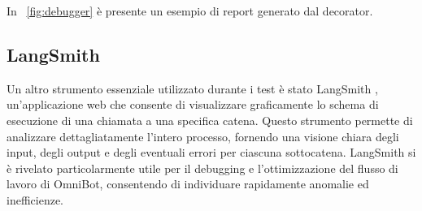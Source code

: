 In \figurename{~\ref{fig:debugger}} è presente un esempio di report generato dal decorator.

\subsection{LangSmith}
Un altro strumento essenziale utilizzato durante i test è stato LangSmith \cite{langsmith}, un'applicazione web che consente di visualizzare graficamente lo schema di esecuzione di una chiamata a una specifica catena. Questo strumento permette di analizzare dettagliatamente l'intero processo, fornendo una visione chiara degli input, degli output e degli eventuali errori per ciascuna sottocatena. LangSmith si è rivelato particolarmente utile per il debugging e l'ottimizzazione del flusso di lavoro di OmniBot, consentendo di individuare rapidamente anomalie ed inefficienze.
